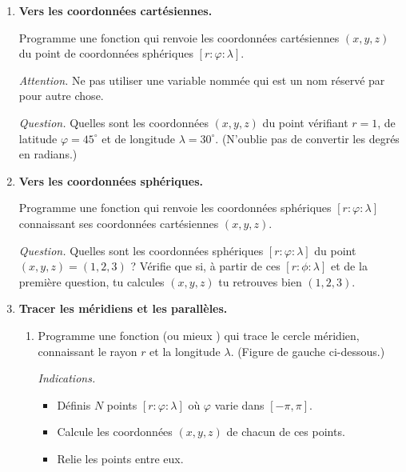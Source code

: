 \documentclass[11pt,class=report,crop=false]{standalone}
\begin{document}
\begin{activite}
	
	
	
\begin{enumerate}
		
	\item \textbf{Vers les coordonnées cartésiennes.}
	
	Programme une fonction  qui renvoie les coordonnées
	cartésiennes $(x,y,z)$ du point de coordonnées sphériques $[r:\varphi:\lambda]$.
	
	\emph{Attention.} Ne pas utiliser une variable nommée  qui est un nom réservé par \Python{} pour autre chose.
	
	\emph{Question.} Quelles sont les coordonnées $(x,y,z)$ du point vérifiant $r=1$, de latitude $\varphi = 45^\circ$ et de longitude $\lambda=30^\circ$. (N'oublie pas de convertir les degrés en radians.)
	
	\item \textbf{Vers les coordonnées sphériques.}
	
	Programme une fonction  qui renvoie les coordonnées sphériques $[r:\varphi:\lambda]$ connaissant ses coordonnées cartésiennes $(x,y,z)$.
	
	\emph{Question.} Quelles sont les coordonnées sphériques $[r:\varphi:\lambda]$ du point $(x,y,z)=(1,2,3)$ ?
	Vérifie que si, à partir de ces $[r:\phi:\lambda]$ et de la première question, tu calcules $(x,y,z)$ tu retrouves bien $(1,2,3)$.
	
	\item \textbf{Tracer les méridiens et les parallèles.}
	\begin{enumerate}
		\item Programme une fonction 
		(ou mieux )
		qui trace le cercle méridien, connaissant le rayon $r$ et la longitude $\lambda$. (Figure de gauche ci-dessous.)
		
		\emph{Indications.}
		\begin{itemize}
			\item Définis $N$ points $[r:\varphi:\lambda]$ où $\varphi$ varie dans $[-\pi,\pi]$.
			\item Calcule les coordonnées $(x,y,z)$ de chacun de ces points.
			\item Relie les points entre eux.
		\end{itemize}
	

\end{enumerate}
\end{enumerate}
\end{activite}
\end{document}
